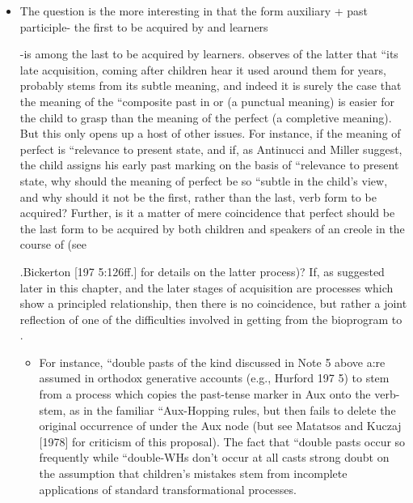 \begin{itemize}
\begin{itemize}
\begin{itemize}
\begin{itemize}
\begin{itemize}
\begin{itemize}
\begin{itemize}
\begin{itemize}
\begin{itemize}
\begin{itemize}
\item The question is the more interesting in that the form auxiliary + past participle- the first to be acquired by  and  learners

{}-is among the last to be acquired by  learners. \citet{Maratsos1979} observes of the latter that ``its late acquisition, coming after children hear it used around them for years, probably stems from its subtle meaning, and indeed it is surely the case that the meaning of the ``composite past in  or  (a punctual meaning) is easier for the child to grasp than the meaning of the  perfect (a com\-pletive meaning). But this only opens up a host of other issues. For instance, if the meaning of  perfect is ``relevance to present state, and if, as Antinucci and Miller suggest, the child assigns his early past marking on the basis of ``relevance to present state, why should the meaning of perfect be so ``subtle in the child's view, and why should it not be the first, rather than the last, verb form to be acquired? Further, is it a matter of mere coincidence that perfect should be the last form to be acquired by both children   and speakers of an  creole in the course of  (see

.Bickerton [197 5:126ff.] for details on the latter process)? If, as suggested later in this chapter,  and the later stages of acquisition are processes which show a principled relationship, then there is no coincidence, but rather a joint reflection of one of the difficulties involved in getting from the bioprogram to .

\begin{itemize}
\item For instance, ``double pasts of the kind discussed in Note 5 above a:re assumed in orthodox generative accounts (e.g., Hurford 197 5) to stem from a process which copies the past-tense marker in Aux onto the verb-stem, as in the familiar ``Aux-Hopping rules, but then fails to delete the original occurrence of  under the Aux node (but see Matatsos and Kuczaj [1978] for criticism of this proposal). The fact that ``double pasts occur so frequently while ``double-WHs don't occur at all casts strong doubt on the assumption that children's mistakes stem from incomplete applications of standard transformational processes.
\end{itemize}


\end{itemize}
\end{itemize}
\end{itemize}
\end{itemize}
\end{itemize}
\end{itemize}
\end{itemize}
\end{itemize}
\end{itemize}
\end{itemize}
